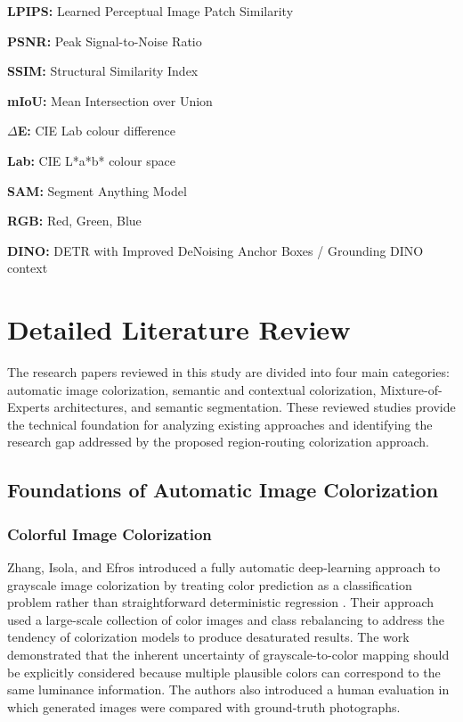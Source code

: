 \documentclass{FastFyp}
\begin{document}
\textbf{LPIPS:} Learned Perceptual Image Patch Similarity

\textbf{PSNR:} Peak Signal-to-Noise Ratio

\textbf{SSIM:} Structural Similarity Index

\textbf{mIoU:} Mean Intersection over Union

\textbf{$\Delta$E:} CIE Lab colour difference

\textbf{Lab:} CIE L*a*b* colour space

\textbf{SAM:} Segment Anything Model

\textbf{RGB:} Red, Green, Blue

\textbf{DINO:} DETR with Improved DeNoising Anchor Boxes / Grounding DINO context

\section{Detailed Literature Review}

The research papers reviewed in this study are divided into four main categories: automatic image colorization, semantic and contextual colorization, Mixture-of-Experts architectures, and semantic segmentation. These reviewed studies provide the technical foundation for analyzing existing approaches and identifying the research gap addressed by the proposed region-routing colorization approach.~

\subsection{Foundations of Automatic Image Colorization}

\subsubsection{Colorful Image Colorization}

Zhang, Isola, and Efros introduced a fully automatic deep-learning approach to grayscale image colorization by treating color prediction as a classification problem rather than straightforward deterministic regression \cite{ref1}. Their approach used a large-scale collection of color images and class rebalancing to address the tendency of colorization models to produce desaturated results. The work demonstrated that the inherent uncertainty of grayscale-to-color mapping should be explicitly considered because multiple plausible colors can correspond to the same luminance information. The authors also introduced a human evaluation in which generated images were compared with ground-truth photographs.
\end{document}
